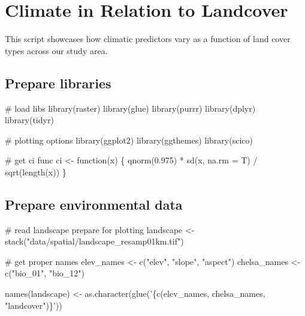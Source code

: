 \documentclass[]{article}
\newenvironment{Shaded}{}{}
\newcommand{\CommentTok}[1]{\textcolor[rgb]{0.00,0.50,0.00}{#1}}
\newcommand{\ControlFlowTok}[1]{\textcolor[rgb]{0.00,0.00,1.00}{#1}}
\newcommand{\DataTypeTok}[1]{#1}
\newcommand{\FloatTok}[1]{#1}
\newcommand{\KeywordTok}[1]{\textcolor[rgb]{0.00,0.00,1.00}{#1}}
\newcommand{\NormalTok}[1]{#1}
\newcommand{\OperatorTok}[1]{#1}
\newcommand{\StringTok}[1]{\textcolor[rgb]{0.00,0.50,0.50}{#1}}
\begin{document}
\hypertarget{climate-in-relation-to-landcover}{%
\section{Climate in Relation to Landcover}\label{climate-in-relation-to-landcover}}

This script showcases how climatic predictors vary as a function of land cover types across our study area.

\hypertarget{prepare-libraries-1}{%
\subsection{Prepare libraries}\label{prepare-libraries-1}}

\begin{Shaded}
\begin{Highlighting}[numbers=left,,]
\CommentTok{# load libs}
\KeywordTok{library}\NormalTok{(raster)}
\KeywordTok{library}\NormalTok{(glue)}
\KeywordTok{library}\NormalTok{(purrr)}
\KeywordTok{library}\NormalTok{(dplyr)}
\KeywordTok{library}\NormalTok{(tidyr)}

\CommentTok{# plotting options}
\KeywordTok{library}\NormalTok{(ggplot2)}
\KeywordTok{library}\NormalTok{(ggthemes)}
\KeywordTok{library}\NormalTok{(scico)}

\CommentTok{# get ci func}
\NormalTok{ci <-}\StringTok{ }\ControlFlowTok{function}\NormalTok{(x) \{}
  \KeywordTok{qnorm}\NormalTok{(}\FloatTok{0.975}\NormalTok{) }\OperatorTok{*}\StringTok{ }\KeywordTok{sd}\NormalTok{(x, }\DataTypeTok{na.rm =}\NormalTok{ T) }\OperatorTok{/}\StringTok{ }\KeywordTok{sqrt}\NormalTok{(}\KeywordTok{length}\NormalTok{(x))}
\NormalTok{\}}
\end{Highlighting}
\end{Shaded}

\hypertarget{prepare-environmental-data}{%
\subsection{Prepare environmental data}\label{prepare-environmental-data}}

\begin{Shaded}
\begin{Highlighting}[numbers=left,,]
\CommentTok{# read landscape prepare for plotting}
\NormalTok{landscape <-}\StringTok{ }\KeywordTok{stack}\NormalTok{(}\StringTok{"data/spatial/landscape_resamp01km.tif"}\NormalTok{)}

\CommentTok{# get proper names}
\NormalTok{elev_names <-}\StringTok{ }\KeywordTok{c}\NormalTok{(}\StringTok{"elev"}\NormalTok{, }\StringTok{"slope"}\NormalTok{, }\StringTok{"aspect"}\NormalTok{)}
\NormalTok{chelsa_names <-}\StringTok{ }\KeywordTok{c}\NormalTok{(}\StringTok{"bio_01"}\NormalTok{, }\StringTok{"bio_12"}\NormalTok{)}

\KeywordTok{names}\NormalTok{(landscape) <-}\StringTok{ }\KeywordTok{as.character}\NormalTok{(}\KeywordTok{glue}\NormalTok{(}\StringTok{'\{c(elev_names, chelsa_names, "landcover")\}'}\NormalTok{))}
\end{Highlighting}
\end{Shaded}
\end{document}
